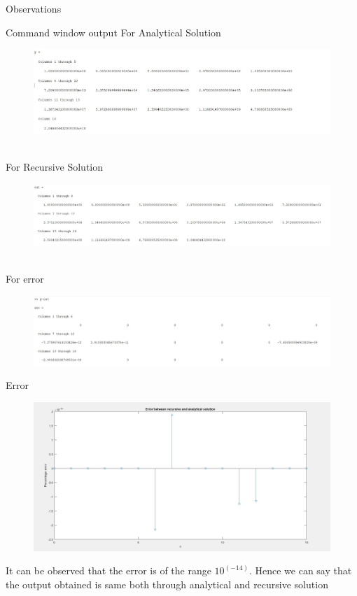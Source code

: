 \documentclass[12pt, letterpaper]{article}
\begin{document}
\begin{section}{Observations}
\begin{subsection}{Command window output}
For Analytical Solution
\begin{figure}[!htp]
\includegraphics[width=1\textwidth]{fig8.jpg}
\end{figure}
\\For Recursive Solution
\begin{figure}[!htp]
\includegraphics[width=1\textwidth]{fig9.jpg}
\end{figure}
\\For error
\begin{figure}[!htp]
\includegraphics[width=1\textwidth]{fig10.jpg}
\end{figure}
\end{subsection}

\begin{subsection}{Error}
\begin{figure}[!htp]
\includegraphics[width=1\textwidth]{fig5.jpg}
\end{figure}
It can be observed that the error is of the range $10^{(-14)}$. Hence we can say that the output obtained is same both through analytical and recursive solution
\end{subsection}
\end{section}
\end{document}
